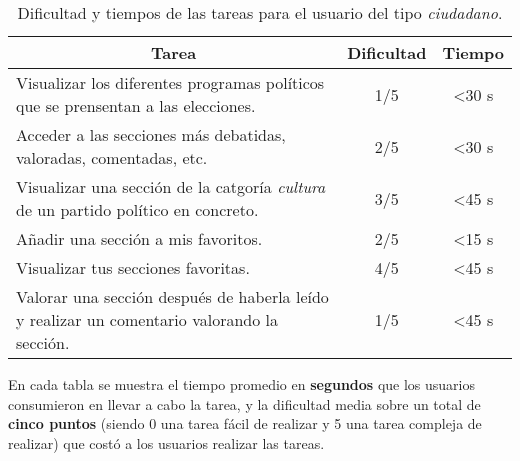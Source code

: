 \begin{table}[!]
\centering
\caption{Dificultad y tiempos de las tareas para el usuario del tipo \textit{ciudadano}.}
\label{tableUserEvC}
\begin{tabular}{|m{9cm}|c|c|}
\hline
\multicolumn{1}{|c|}{{\bf Tarea}}                                                          	& {\bf Dificultad} & {\bf Tiempo}   \\ \hline
Visualizar los diferentes programas políticos que se prensentan a las elecciones.          	& 1/5              & \textless 30 s \\ \hline
Acceder a las secciones más debatidas, valoradas, comentadas, etc.                         	& 2/5              & \textless 30 s \\ \hline
Visualizar una sección de la catgoría \textit{cultura} de un partido político en concreto.	& 3/5              & \textless 45 s \\ \hline
Añadir una sección a mis favoritos.                                                         	& 2/5              & \textless 15 s \\ \hline
Visualizar tus secciones favoritas.                                                         	& 4/5              & \textless 45 s \\ \hline
Valorar una sección después de haberla leído y realizar un comentario valorando la sección. 	& 1/5              & \textless 45 s \\ \hline
\end{tabular}
\end{table}

En cada tabla se muestra el tiempo promedio en \textbf{segundos} que los usuarios consumieron en llevar a cabo la tarea, y la dificultad media sobre un total de \textbf{cinco puntos} (siendo 0 una tarea fácil de realizar y 5 una tarea compleja de realizar) que costó a los usuarios realizar las tareas.

